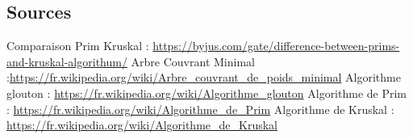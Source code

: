 \documentclass[10pt]{beamer}
\begin{document}
\begin{frame}
\section{Sources}
  Comparaison Prim Kruskal : \url{https://byjus.com/gate/difference-between-prims-and-kruskal-algorithum/}
  \newline
  Arbre Couvrant Minimal :\url{https://fr.wikipedia.org/wiki/Arbre_couvrant_de_poids_minimal}
    \newline
  Algorithme glouton : \url{https://fr.wikipedia.org/wiki/Algorithme_glouton}
    \newline
  Algorithme de Prim : \url{https://fr.wikipedia.org/wiki/Algorithme_de_Prim}
    \newline
  Algorithme de Kruskal : \url{https://fr.wikipedia.org/wiki/Algorithme_de_Kruskal}
  
\end{frame}
\end{document}
